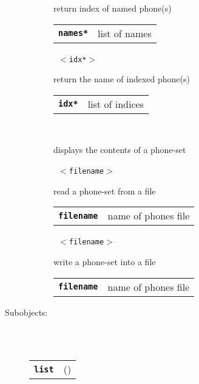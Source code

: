 \begin{description}
\begin{description}
        return index of named phone(s)

      \begin{tabular}{ll}
 \texttt{\textbf{names*}} & list of names \\
      \end{tabular}
       \texttt{ $<$idx*$>$} \

        return the name of indexed phone(s)

      \begin{tabular}{ll}
 \texttt{\textbf{idx*}} & list of indices \\
      \end{tabular}
       \texttt{} \

        displays the contents of a phone-set

       \texttt{ $<$filename$>$} \

        read a phone-set from a file

      \begin{tabular}{ll}
 \texttt{\textbf{filename}} &  name of phones file  \\
      \end{tabular}
       \texttt{ $<$filename$>$} \

        write a phone-set into a file

      \begin{tabular}{ll}
 \texttt{\textbf{filename}} &  name of phones file  \\
      \end{tabular}
    \end{description}

  \item[Subobjects:] \hfill \\
\ 
    \begin{tabular}{ll}
      \texttt{\textbf{list}} & (\Jref{module}{List}) \\
    \end{tabular}
\vspace{3mm}

\end{description}

